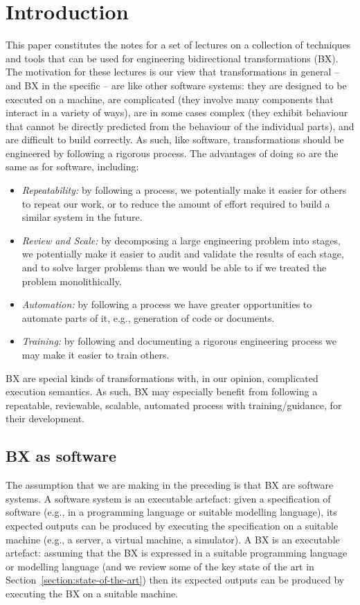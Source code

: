\section{Introduction}
\label{section:introduction}

This paper constitutes the notes for a set of lectures on a collection of techniques and tools that can be used for engineering bidirectional transformations (BX). The motivation for these lectures is our view that transformations in general -- and BX in the specific -- are like other software systems: they are designed to be executed on a machine, are complicated (they involve many components that interact in a variety of ways), are in some cases complex (they exhibit behaviour that cannot be directly predicted from the behaviour of the individual parts), and are difficult to build correctly. As such, like software, transformations should be engineered by following a rigorous process. The advantages of doing so are the same as for software, including:
\begin{itemize}
\item \textit{Repeatability:} by following a process, we potentially make it easier for others to repeat our work, or to reduce the amount of effort required to build a similar system in the future.
\item \textit{Review and Scale:} by decomposing a large engineering problem into stages, we potentially make it easier to audit and validate the results of each stage, and to solve larger problems than we would be able to if we treated the problem monolithically.
\item \textit{Automation:} by following a process we have greater opportunities to automate parts of it, e.g., generation of code or documents. 
\item \textit{Training:} by following and documenting a rigorous engineering process we may make it easier to train others.
\end{itemize}
BX are special kinds of transformations with, in our opinion, complicated execution semantics. As such, BX may especially benefit from following a repeatable, reviewable, scalable, automated process with training/guidance, for their development.

\subsection{BX as software}
The assumption that we are making in the preceding is that BX are software systems. A software system is an executable artefact: given a specification of software (e.g., in a programming language or suitable modelling language), its expected outputs can be produced by executing the specification on a suitable machine (e.g., a server, a virtual machine, a simulator). A BX is an executable artefact: assuming that the BX is expressed in a suitable programming language or modelling language (and we review some of the key state of the art in Section~\ref{section:state-of-the-art}) then its expected outputs can be produced by executing the BX on a suitable machine. 

